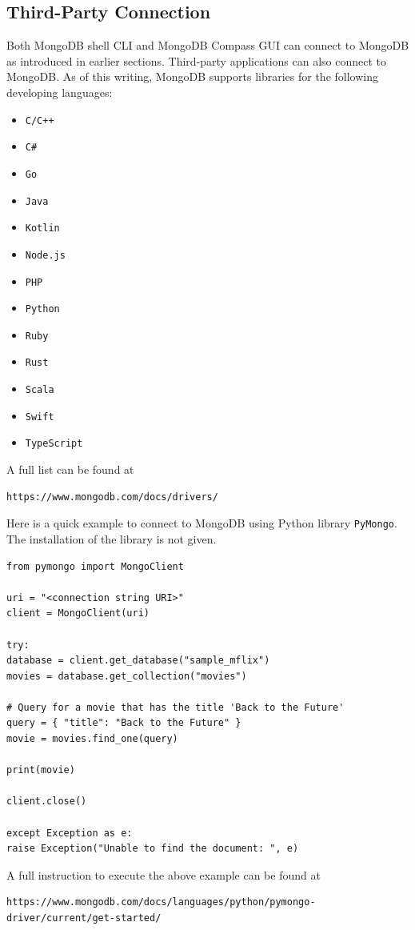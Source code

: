\subsection{Third-Party Connection}

Both MongoDB shell CLI and MongoDB Compass GUI can connect to MongoDB as introduced in earlier sections. Third-party applications can also connect to MongoDB. As of this writing, MongoDB supports libraries for the following developing languages:
\begin{multicols}{4}
\begin{itemize}
	\item \verb|C/C++|
	\item \verb|C#|
	\item \verb|Go|
	\item \verb|Java|
	\item \verb|Kotlin|
	\item \verb|Node.js|
	\item \verb|PHP|
	\item \verb|Python|
	\item \verb|Ruby|
	\item \verb|Rust|
	\item \verb|Scala|
	\item \verb|Swift|
	\item \verb|TypeScript|
\end{itemize}
\end{multicols}
A full list can be found at
\begin{lstlisting}
https://www.mongodb.com/docs/drivers/
\end{lstlisting}

Here is a quick example to connect to MongoDB using Python library \verb|PyMongo|. The installation of the library is not given.
\begin{lstlisting}
from pymongo import MongoClient

uri = "<connection string URI>"
client = MongoClient(uri)

try:
database = client.get_database("sample_mflix")
movies = database.get_collection("movies")

# Query for a movie that has the title 'Back to the Future'
query = { "title": "Back to the Future" }
movie = movies.find_one(query)

print(movie)

client.close()

except Exception as e:
raise Exception("Unable to find the document: ", e)
\end{lstlisting}
A full instruction to execute the above example can be found at
\begin{lstlisting}
https://www.mongodb.com/docs/languages/python/pymongo-driver/current/get-started/
\end{lstlisting}












